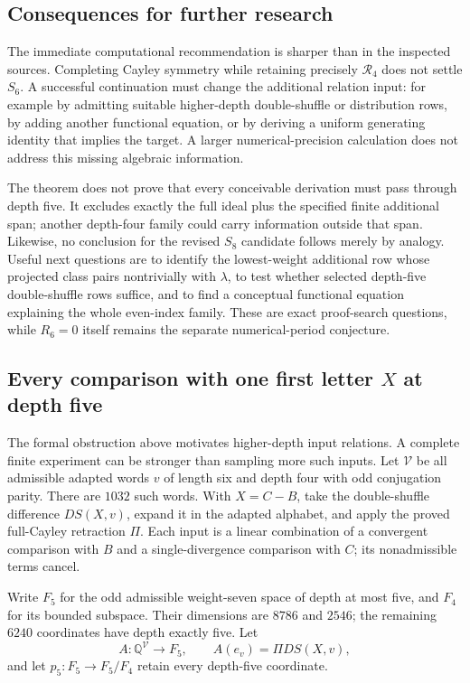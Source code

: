 \subsection{Consequences for further research}

The immediate computational recommendation is sharper than in the
inspected sources. Completing Cayley symmetry while retaining precisely
$\mathcal R_4$ does not settle $S_6$. A successful continuation must change
the additional relation input: for example by admitting suitable
higher-depth double-shuffle or distribution rows, by adding another
functional equation, or by deriving a uniform generating identity that
implies the target. A larger numerical-precision calculation does not
address this missing algebraic information.

The theorem does not prove that every conceivable derivation must pass
through depth five. It excludes exactly the full ideal plus the specified
finite additional span; another depth-four family could carry information
outside that span. Likewise, no conclusion for the revised $S_8$ candidate
follows merely by analogy. Useful next questions are to identify the
lowest-weight additional row whose projected class pairs nontrivially
with $\lambda$, to test whether selected depth-five double-shuffle rows
suffice, and to find a conceptual functional equation explaining the
whole even-index family. These are exact proof-search questions, while
$R_6=0$ itself remains the separate numerical-period conjecture.


\subsection{Every comparison with one first letter \texorpdfstring{$X$}{X} at depth five}
\label{fcd5:section}

The formal obstruction above motivates higher-depth input relations.
A complete finite experiment can be stronger than sampling more such
inputs.  Let $\mathcal V$ be all admissible adapted words $v$ of
length six and depth four with odd conjugation parity.  There are
$1032$ such words.  With $X=C-B$, take the double-shuffle difference
$DS(X,v)$, expand it in the adapted alphabet, and apply the proved
full-Cayley retraction $\Pi$.  Each input is a linear combination of
a convergent comparison with $B$ and a single-divergence comparison
with $C$; its nonadmissible terms cancel.

Write $F_5$ for the odd admissible weight-seven space of depth at
most five, and $F_4$ for its bounded subspace.  Their dimensions are
$8786$ and $2546$; the remaining $6240$ coordinates have depth
exactly five.  Let
\[
 A:\mathbb Q^{\mathcal V}\longrightarrow F_5,\qquad
 A(e_v)=\Pi DS(X,v),
\]
and let $p_5:F_5\to F_5/F_4$ retain every depth-five coordinate.

